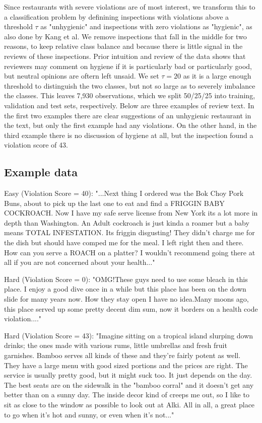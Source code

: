 \documentclass{article}
\begin{document}
Since restaurants with severe violations are of most interest, we 
transform this to a classification problem by definining inspections with violations above a threshold $\tau$ as "unhygienic" 
and inspections with zero violations as "hygienic", as also done by Kang et al. We remove inspections that fall in the middle 
for two reasons, to keep relative class balance and because there is little signal in the reviews of these inspections. Prior 
intuition and review of the data shows that reviewers may comment on hygiene if it is particularly bad or particularly 
good, but neutral opinions are oftern left unsaid. We set $\tau = 20$ as it is a large enough threshold to distinguish 
the two classes, but not so large as to severely imbalance the classes. This leaves 7,930 observations, which we split 50/25/25 into training, validation and test sets, respectively. Below are three examples of review text. In the first two examples 
there are clear suggestions of an unhygienic restaurant in the text, but only the first example had any violations. On the 
other hand, in the third example there is no discussion of hygiene at all, but the inspection found a violation score of 43.

\subsection{Example data}
\small
Easy (Violation Score = 40): "...Next thing I ordered was the Bok Choy Pork Buns, about to pick up the last one to eat and find a 
FRIGGIN BABY COCKROACH. Now I  have my safe serve license from New York its a lot more in depth than Washington. An Adult 
cockroach is just kinda a roamer but a baby means TOTAL INFESTATION. Its friggin disgusting! They didn't charge me for the 
dish but should have comped me for the meal. I left right then and there. How can you serve a ROACH on a platter? I wouldn't 
recommend going there at all if you are not concerned about your health..." \newline

Hard (Violation Score = 0): "OMG!These guys need to use some bleach in this place. I enjoy a good dive once in a while but this place
has been on the down slide for many years now. How they stay open I have no idea.Many moons ago, this place served up some 
pretty decent dim sum, now it borders on a health code violation...." \newline

Hard (Violation Score = 43): "Imagine sitting on a tropical island slurping down drinks; the ones made with various rums, little 
umbrellas and fresh fruit garnishes. Bamboo serves all kinds of these and they're fairly potent as well. They have a large 
menu with good sized portions and the prices are right. The service is usually pretty good, but it might suck too. It just 
depends on the day. The best seats are on the sidewalk in the "bamboo corral" and it doesn't get any better than on a sunny 
day. The inside decor kind of creeps me out, so I like to sit as close to the window as possible to look out at Alki. All in 
all, a great place to go when it's hot and sunny, or even when it's not..." \newline
\end{document}
